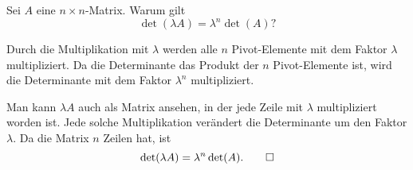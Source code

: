 Sei $A$ eine $n\times n$-Matrix. Warum gilt
\[
\det(\lambda A)=\lambda^n\det(A)?
\]


\begin{loesung}
Durch die Multiplikation mit $\lambda$ werden alle $n$ Pivot-Elemente mit dem
Faktor $\lambda$ multipliziert. Da die Determinante das Produkt der $n$ Pivot-Elemente
ist, wird die Determinante mit dem Faktor $\lambda^n$ multipliziert.

Man kann $\lambda A$ auch als Matrix ansehen, in der jede Zeile mit $\lambda$
multipliziert worden ist. Jede solche Multiplikation verändert die Determinante
um den Faktor $\lambda$. Da die Matrix $n$ Zeilen hat, ist
\[
\det(\lambda A)=\lambda^n \det(A).
\qedhere
\]
\end{loesung}
